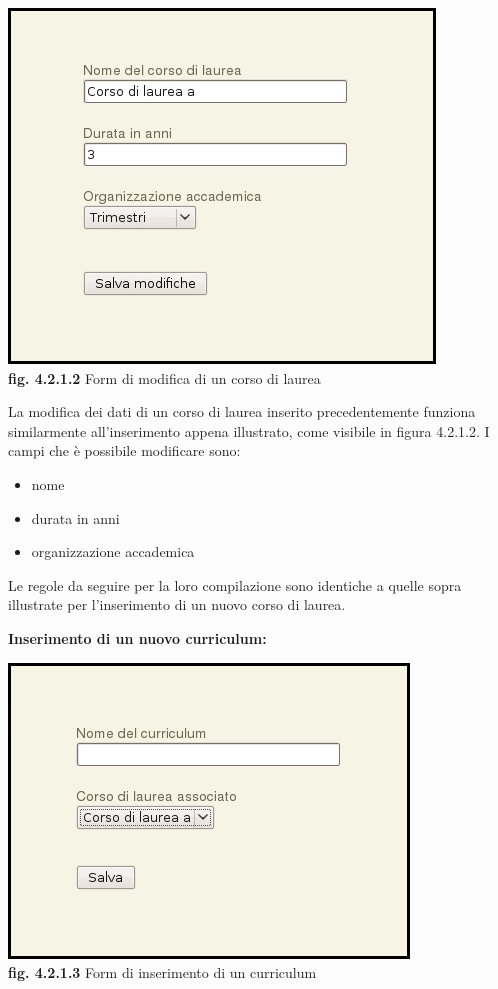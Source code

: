 \documentclass[11pt,a4paper]{article}
\begin{document}
\begin{center}
	\includegraphics[scale=0.5]{images/modifica_corso.jpg}\\
	\textbf{fig. 4.2.1.2} Form di modifica di un corso di laurea\\
\end{center}

La modifica dei dati di un corso di laurea inserito precedentemente funziona similarmente all'inserimento appena illustrato, come visibile in figura 4.2.1.2. I campi che è possibile modificare sono:
\begin{itemize}
 \item nome
 \item durata in anni
 \item organizzazione accademica
\end{itemize}
Le regole da seguire per la loro compilazione sono identiche a quelle sopra illustrate per l'inserimento di un nuovo corso di laurea.
\newline \newline
\begin{large}\textbf{Inserimento di un nuovo curriculum:}\end{large}

\begin{center}
	\includegraphics[scale=0.5]{images/nuovo_curriculum.jpg}\\
	\textbf{fig. 4.2.1.3} Form di inserimento di un curriculum\\
\end{center}
\end{document}
